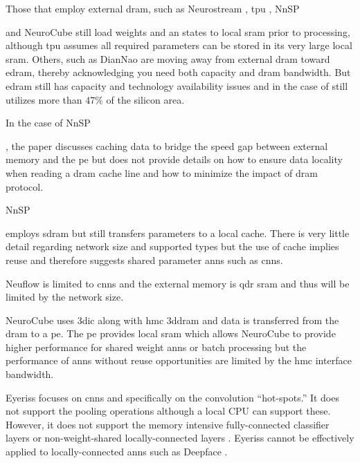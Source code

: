 Those that employ external \ac{dram}, such as Neurostream \cite{azarkhish2017neurostream}, \ac{tpu} \cite{jouppi2017datacenter}, NnSP{\cite{esmaeilzadeh2005nnsp} and NeuroCube\cite{kim2016neurocube} still 
load weights and \ac{an} states to local \ac{sram} prior to processing, although \ac{tpu} assumes all required parameters can be stored in its very large local \ac{sram}.
Others, such as DianNao \cite{chen2016diannao} are moving away from external \ac{dram} toward \ac{edram}, thereby acknowledging you need both capacity and \ac{dram} bandwidth. 
But \ac{edram} still has capacity and technology availability issues and in the case of \cite{dadiannao2017} still utilizes more than 47\% of the silicon area.

In the case of NnSP{\cite{esmaeilzadeh2005nnsp}, the paper discusses caching data to bridge the speed gap between external memory and the \ac{pe} 
but does not provide details on how to ensure data locality when reading a \ac{dram} cache line and how to minimize the impact of \ac{dram} protocol.

NnSP {\cite{esmaeilzadeh2005nnsp} employs \ac{sdram} but still transfers parameters to a local cache.
There is very little detail regarding network size and supported types but the use of cache implies reuse and therefore suggests shared parameter \acp{ann} such as \acp{cnn}.

Neuflow\cite{farabet2011neuflow} is limited to \acp{cnn} and the external memory is \ac{qdr} \ac{sram} 
and thus will be limited by the network size.

NeuroCube\cite{kim2016neurocube} uses \ac{3dic} along with \ac{hmc} \ac{3ddram} and data is transferred from the \ac{dram} to a \ac{pe}.
The \ac{pe} provides local \ac{sram} which allows NeuroCube\cite{kim2016neurocube} to provide higher performance for shared weight \acp{ann} or batch processing but the performance of \acp{ann} without reuse opportunities are limited by the \ac{hmc} interface bandwidth.

Eyeriss\cite{chen201614} focuses on \acp{cnn} and specifically on the convolution ``hot-spots.''  
It does not support the pooling operations although a local CPU can support these.
However, it does not support the memory intensive fully-connected classifier layers or non-weight-shared locally-connected layers \cite{le2013building}\cite{Taigman_2014_CVPR}.
Eyeriss cannot be effectively applied to locally-connected \acp{ann} such as Deepface \cite{Taigman_2014_CVPR}.

}}}
